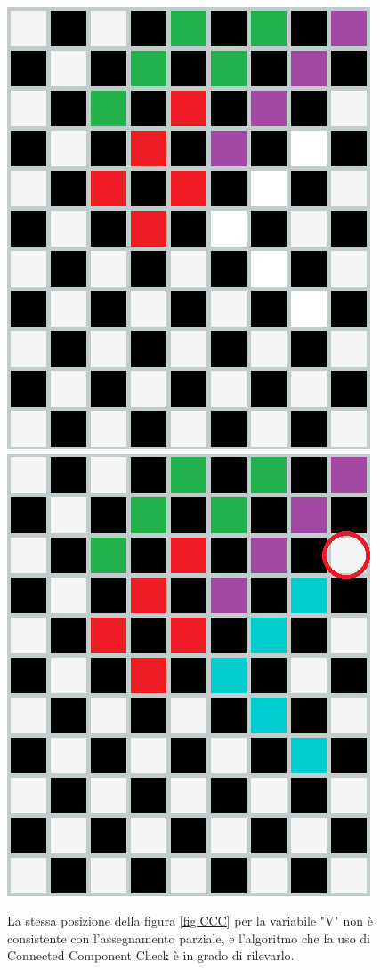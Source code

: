 \begin{figure}[h]
	\centering
	{\includegraphics[scale=0.35]{immagini/esCC}}
	\hspace{5mm}
	{\includegraphics[scale=0.35]{immagini/esCC_no}}
	\caption{La stessa posizione della figura \ref{fig:CCC} per la variabile "V" non è consistente con l'assegnamento parziale, e l'algoritmo che fa uso di Connected Component Check è in grado di rilevarlo.}
	\label{fig:badCCC}
\end{figure}

